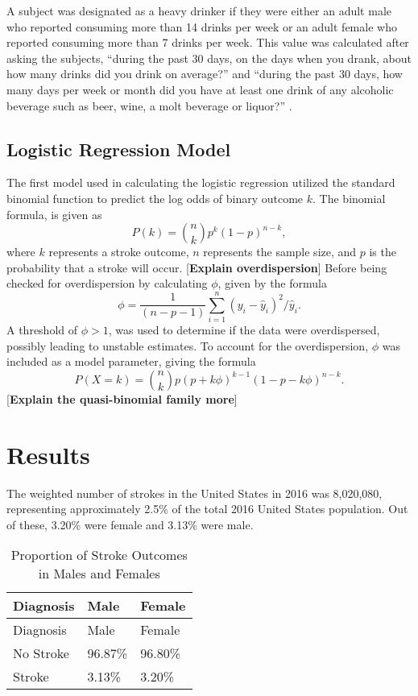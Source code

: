 \documentclass[11pt,]{article}
\begin{document}
A subject was designated as a heavy drinker if they were either an adult
male who reported consuming more than 14 drinks per week or an adult
female who reported consuming more than 7 drinks per week. This value
was calculated after asking the subjects, ``during the past 30 days, on
the days when you drank, about how many drinks did you drink on
average?'' and ``during the past 30 days, how many days per week or
month did you have at least one drink of any alcoholic beverage such as
beer, wine, a molt beverage or liquor?''
\citep{CentersforDiseaseControlandPrevention2007}.

\subsection{Logistic Regression Model}\label{logistic-regression-model}

The first model used in calculating the logistic regression utilized the
standard binomial function to predict the log odds of binary outcome
\(k\). The binomial formula, is given as
\[P(k)={n \choose k}p^{k}(1-p)^{n-k},\] where \(k\) represents a stroke
outcome, \(n\) represents the sample size, and \(p\) is the probability
that a stroke will occur. {[}\textbf{Explain overdispersion}{]} Before
being checked for overdispersion by calculating \(\phi\), given by the
formula
\[\phi = \frac{1}{(n-p-1)}\sum_{i=1}^{n} (y_{i} -\hat{y} _{i})^{2} 
/ \hat{y} _{i}.\] A threshold of \(\phi > 1\), was used to determine if
the data were overdispersed, possibly leading to unstable estimates. To
account for the overdispersion, \(\phi\) was included as a model
parameter, giving the formula
\[P(X=k)={n \choose k}p(p+k\phi)^{k-1}(1-p-k\phi)^{n-k}.\]
{[}\textbf{Explain the quasi-binomial family more}{]}

\section{Results}\label{results}

The weighted number of strokes in the United States in 2016 was
8,020,080, representing approximately 2.5\% of the total 2016 United
States population. Out of these, 3.20\% were female and 3.13\% were
male.

\begin{longtable}[]{@{}lll@{}}
\caption{Proportion of Stroke Outcomes in Males and
Females}\tabularnewline
\toprule
Diagnosis & Male & Female\tabularnewline
\midrule
\endfirsthead
\toprule
Diagnosis & Male & Female\tabularnewline
\midrule
\endhead
No Stroke & 96.87\% & 96.80\%\tabularnewline
Stroke & 3.13\% & 3.20\%\tabularnewline
\bottomrule
\end{longtable}
\end{document}

